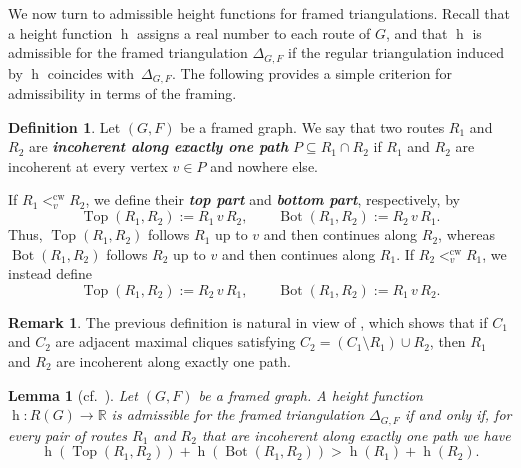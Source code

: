 \documentclass[12pt, reqno]{amsart}
\newcommand{\defn}[1]{{\color{blue!50!black}\textbf{\emph{#1}}}}
\newcommand{\Top}{\operatorname{Top}}
\newcommand{\Bot}{\operatorname{Bot}}
\newcommand{\h}{\operatorname{h}}
\theoremstyle{plain}
\newtheorem{lemma}[theorem]{Lemma}
\theoremstyle{definition}
\newtheorem{definition}[theorem]{Definition}
\newtheorem{remark}[theorem]{Remark}
\numberwithin{equation}{section}
\begin{document}
We now turn to admissible height functions for framed triangulations. Recall that a height function $\h$ assigns a real number to each route of $G$, and that $\h$ is admissible for the framed triangulation $\Delta_{G,F}$ if the regular triangulation induced by $\h$ coincides with~$\Delta_{G,F}$. The following  provides a simple criterion for admissibility in terms of the framing.

\begin{definition}\label{def_top_bot}
Let $(G,F)$ be a framed graph. We say that two routes $R_1$ and $R_2$ are \defn{incoherent along exactly one path} $P\subseteq R_1\cap R_2$ if $R_1$ and $R_2$ are incoherent at every vertex $v\in P$ and nowhere else.

If $R_1<^{\mathrm{cw}}_v R_2$, we define their \defn{top part} and \defn{bottom part}, respectively, by
\[
\Top(R_1,R_2):=R_1\,v\,R_2,
\qquad
\Bot(R_1,R_2):=R_2\,v\,R_1.
\]
Thus, $\Top(R_1,R_2)$ follows $R_1$ up to $v$ and then continues along $R_2$, whereas $\Bot(R_1,R_2)$ follows $R_2$ up to $v$ and then continues along $R_1$. If $R_2<^{\mathrm{cw}}_v R_1$, we instead define
\[
\Top(R_1,R_2):=R_2\,v\,R_1,
\qquad
\Bot(R_1,R_2):=R_1\,v\,R_2.
\]
\end{definition}

\begin{remark}
The previous definition is natural in view of \cite[Lemma~1.1.10]{vonBell_framing_2024}, which shows that if $C_1$ and $C_2$ are adjacent maximal cliques satisfying $C_2=(C_1\setminus R_1)\cup R_2$, then $R_1$ and $R_2$ are incoherent along exactly one path.
\end{remark}

\begin{lemma}[cf.~{\cite[Lemmas~5.4 and~5.5]{d2023realizing}}]
\label{lemma_admisible_heigth_function}
Let $(G,F)$ be a framed graph. A height function $\h:R(G)\to\mathbb{R}$ is admissible for the framed triangulation $\Delta_{G,F}$ if and only if, for every pair of routes $R_1$ and $R_2$ that are incoherent along exactly one path we have
\[
\h(\Top(R_1,R_2)) +\h(\Bot(R_1,R_2)) > \h(R_1)+\h(R_2).
\]
\end{lemma}
\end{document}
